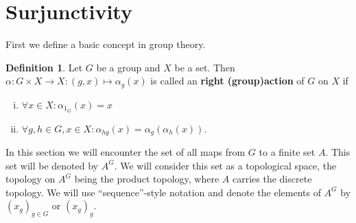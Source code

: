 \documentclass[titlepage, a4paper]{article}
\newcommand{\Z}{\mathbb{Z}}
\DeclareMathOperator{\sym}{Sym}
\theoremstyle{theoremdd}
\theoremstyle{definition}
\newtheorem{definition}[theorem]{Definition}
\theoremstyle{remark}
\begin{document}


 

    \section{Surjunctivity}\label{sec:surjunctivity}

    First we define a basic concept in group theory.

    \begin{definition} %
	    Let $G$ be a group and $X$ be a set. Then $\alpha: G \times X \to X: (g,x) \mapsto \alpha_g(x)$ is called an \textbf{right (group)action} of $G$ on $X$ if
        \begin{enumerate}[(i)]
		\item $\forall x \in X: \alpha_{1_G}(x) = x$
            \item $\forall g,h \in G, x\in X: \alpha_{hg}(x) = \alpha_g(\alpha_h(x))$.
        \end{enumerate}
    \end{definition}

    In this section we will encounter the set of all maps from $G$ to a finite set $A$. This set will be denoted by $A^G$. We will consider this set as a topological space, the topology on $A^G$ being the product topology, where $A$ carries the discrete topology. We will use ``sequence''-style notation and denote the elements of $A^G$ by $(x_g)_{g \in G}$ or $(x_g)_g$.
\end{document}
